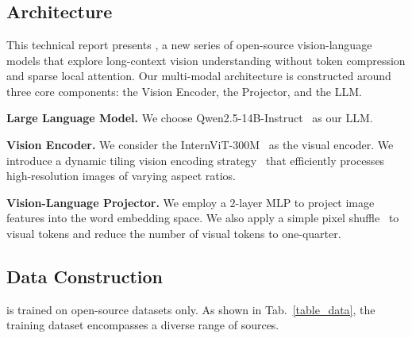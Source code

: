 





\section{\OurMethod}

\subsection{Architecture}
\label{sec:Architecture}








This technical report presents \OurMethod, a new series of open-source vision-language models that explore long-context vision understanding without token compression and sparse local attention.
%
Our multi-modal architecture is constructed around three core components: the Vision Encoder, the Projector, and the LLM.
%


    \textbf{Large Language Model.}
    We choose Qwen2.5-14B-Instruct~\cite{Qwen2.5} as our LLM.
    
    \textbf{Vision Encoder.}
    We consider the InternViT-300M~\cite{InternVL} as the visual encoder.
    We introduce a dynamic tiling vision encoding strategy~\cite{InternVL2} that efficiently processes high-resolution images of varying aspect ratios.

    \textbf{Vision-Language Projector.}
    We employ a $2$-layer MLP to project image features into the word embedding space.
    We also apply a simple pixel shuffle~\cite{InternVL2} to visual tokens and reduce the number of visual tokens to one-quarter.


\subsection{Data Construction}
\label{sec:Data}

%
\OurMethod is trained on open-source datasets only.
%
As shown in Tab.~\ref{table_data}, the training dataset encompasses a diverse range of sources.
%


